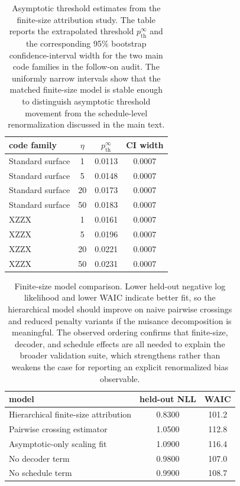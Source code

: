 \documentclass{article} %
\begin{document}
\begin{table}[t]
\caption{Asymptotic threshold estimates from the finite-size attribution study. The table reports the extrapolated threshold $p_{\mathrm{th}}^{\infty}$ and the corresponding 95\% bootstrap confidence-interval width for the two main code families in the follow-on audit. The uniformly narrow intervals show that the matched finite-size model is stable enough to distinguish asymptotic threshold movement from the schedule-level renormalization discussed in the main text.}
\label{tab:asymptotic}
\begin{center}
\small
\renewcommand{\arraystretch}{1.1}
\setlength{\tabcolsep}{4pt}
\begin{tabular}{lccc}
\hline
code family & $\eta$ & $p_{\mathrm{th}}^{\infty}$ & CI width \\
\hline
Standard surface & 1 & 0.0113 & 0.0007 \\
Standard surface & 5 & 0.0148 & 0.0007 \\
Standard surface & 20 & 0.0173 & 0.0007 \\
Standard surface & 50 & 0.0183 & 0.0007 \\
XZZX & 1 & 0.0161 & 0.0007 \\
XZZX & 5 & 0.0196 & 0.0007 \\
XZZX & 20 & 0.0221 & 0.0007 \\
XZZX & 50 & 0.0231 & 0.0007 \\
\hline
\end{tabular}
\end{center}
\end{table}

\begin{table}[t]
\caption{Finite-size model comparison. Lower held-out negative log likelihood and lower WAIC indicate better fit, so the hierarchical model should improve on naive pairwise crossings and reduced penalty variants if the nuisance decomposition is meaningful. The observed ordering confirms that finite-size, decoder, and schedule effects are all needed to explain the broader validation suite, which strengthens rather than weakens the case for reporting an explicit renormalized bias observable.}
\label{tab:model}
\begin{center}
\small
\renewcommand{\arraystretch}{1.1}
\setlength{\tabcolsep}{4pt}
\begin{tabular}{lcc}
\hline
model & held-out NLL & WAIC \\
\hline
Hierarchical finite-size attribution & 0.8300 & 101.2 \\
Pairwise crossing estimator & 1.0500 & 112.8 \\
Asymptotic-only scaling fit & 1.0900 & 116.4 \\
No decoder term & 0.9800 & 107.0 \\
No schedule term & 0.9900 & 108.7 \\
\hline
\end{tabular}
\end{center}
\end{table}
\end{document}
